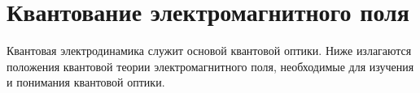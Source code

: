 \chapter{Квантование электромагнитного поля} 
\label{chQuantel}

Квантовая электродинамика служит основой квантовой оптики. Ниже
излагаются положения квантовой теории электромагнитного поля,
необходимые для изучения и понимания квантовой оптики.

















